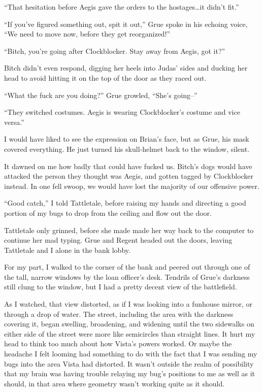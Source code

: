 ``That hesitation before Aegis gave the orders to the hostages\ldots it didn't fit.''



``If you've figured something out, spit it out,'' Grue spoke in his echoing voice, ``We need to move now, before they get reorganized!''



``Bitch, you're going after Clockblocker.  Stay away from Aegis, got it?''



Bitch didn't even respond, digging her heels into Judas' sides and ducking her head to avoid hitting it on the top of the door as they raced out.



``What the fuck are you doing?'' Grue growled, ``She's going--''



``They switched costumes.   Aegis is wearing Clockblocker's costume and vice versa.''



I would have liked to see the expression on Brian's face, but as Grue, his mask covered everything.  He just turned his skull-helmet back to the window, silent.



It dawned on me how badly that could have fucked us.  Bitch's dogs would have attacked the person they thought was Aegis, and gotten tagged by Clockblocker instead.  In one fell swoop, we would have lost the majority of our offensive power.



``Good catch,'' I told Tattletale, before raising my hands and directing a good portion of my bugs to drop from the ceiling and flow out the door.



Tattletale only grinned, before she made made her way back to the computer to continue her mad typing.  Grue and Regent headed out the doors, leaving Tattletale and I alone in the bank lobby.



For my part, I walked to the corner of the bank and peered out through one of the tall, narrow windows by the loan officer's desk.  Tendrils of Grue's darkness still clung to the window, but I had a pretty decent view of the battlefield.



As I watched, that view distorted, as if I was looking into a funhouse mirror, or through a drop of water.  The street, including the area with the darkness covering it, began swelling, broadening, and widening until the two sidewalks on either side of the street were more like semicircles than straight lines.  It hurt my head to think too much about how Vista's powers worked.  Or maybe the headache I felt looming had something to do with the fact that I was sending my bugs into the area Vista had distorted.  It wasn't outside the realm of possibility that my brain was having trouble relaying my bug's positions to me as well as it should, in that area where geometry wasn't working quite as it should.




